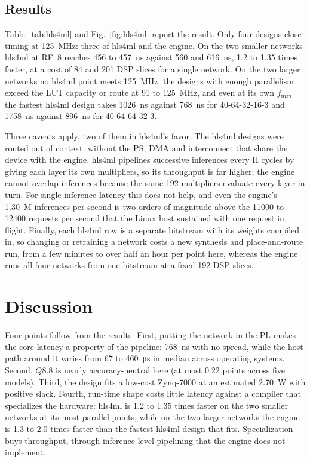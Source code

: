 \documentclass[pdflatex,sn-mathphys-num,iicol]{sn-jnl}
\begin{document}
\subsection{Results}
Table~\ref{tab:hls4ml} and Fig.~\ref{fig:hls4ml} report the result. Only four
designs close timing at \SI{125}{\mega\hertz}: three of hls4ml and the engine.
On the two smaller networks hls4ml at RF~8 reaches 456 to \SI{457}{\nano\second}
against 560 and \SI{616}{\nano\second}, 1.2 to 1.35 times faster, at a cost of 84
and 201 DSP slices for a single network. On the two larger networks no hls4ml
point meets \SI{125}{\mega\hertz}: the designs with enough parallelism exceed
the LUT capacity or route at 91 to \SI{125}{\mega\hertz}, and even at its own
$f_{\max}$ the fastest hls4ml design takes \SI{1026}{\nano\second} against
\SI{768}{\nano\second} for 40-64-32-16-3 and \SI{1758}{\nano\second} against
\SI{896}{\nano\second} for 40-64-64-32-3.

Three caveats apply, two of them in hls4ml's favor. The hls4ml designs were routed
out of context, without the PS, DMA and interconnect that share the device with
the engine. hls4ml pipelines successive inferences every II cycles by giving each
layer its own multipliers, so its throughput is far higher; the engine cannot
overlap inferences because the same 192 multipliers evaluate every layer in
turn. For single-inference latency this does not help, and even the engine's
\SI{1.30}{M} inferences per second is two orders of magnitude above the
\num{11000} to \num{12400} requests per second that the Linux host sustained with
one request in flight. Finally, each hls4ml row is a separate bitstream with its
weights compiled in, so changing or retraining a network costs a new synthesis
and place-and-route run, from a few minutes to over half an hour per point here,
whereas the engine runs all four networks from one bitstream at a fixed 192 DSP
slices.

\section{Discussion}
Four points follow from the results. First, putting the network in the PL makes
the core latency a property of the pipeline: \SI{768}{\nano\second} with no
spread, while the host path around it varies from \SI{67}{} to
\SI{460}{\micro\second} in median across operating systems. Second, $Q8.8$ is
nearly accuracy-neutral here (at most 0.22 points across five models). Third,
the design fits a low-cost Zynq-7000 at an estimated \SI{2.70}{\watt} with
positive slack. Fourth, run-time shape costs little latency against a compiler
that specializes the hardware: hls4ml is 1.2 to 1.35 times faster on the two
smaller networks at its most parallel points, while on the two larger networks
the engine is 1.3 to 2.0 times faster than the fastest hls4ml design that fits.
Specialization buys throughput, through inference-level pipelining that the
engine does not implement.
\end{document}
